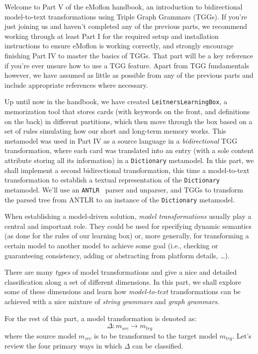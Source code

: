 \genHeader

Welcome to Part V of the eMoflon handbook, an introduction to bidirectional model-to-text transformations using Triple Graph Grammars (TGGs). If you're just
joining us and haven't completed any of the previous parts, we recommend working through at least Part I for the required setup and installation instructions
to ensure eMoflon is working correctly, and strongly encourage finishing Part IV to master the basics of TGGs. That part will be a key reference if you're ever
unsure how to use a TGG feature. Apart from TGG fundamentals however, we have assumed as little as possible from any of the previous parts and
include appropriate references where necessary.

Up until now in the handbook, we have created \texttt{LeitnersLearningBox}, a memorization tool that stores cards (with keywords on the front, and definitions
on the back) in different partitions, which then move through the box based on a set of rules simulating how our short and long-term memory works. This
metamodel was used in Part IV as a source language in a \emph{bidirectional}  TGG transformation, where each card was
translated into an entry (with a sole content attribute storing all its information) in a \texttt{Dictionary} metamodel. In this part, we shall implement a
second bidirectional transformation, this time a model-to-text transformation to establish a textual representation of the  \texttt{Dictionary} metamodel.
We'll use an \texttt{ANTLR}~\cite{ANTLR} parser and unparser, and TGGs to transform the parsed tree from ANTLR to an instance of the \texttt{Dictionary}
metamodel.

When establishing a model-driven solution, \emph{model transformations} usually play a central and important role. They could be used for specifying dynamic
semantics (as done for the rules of our learning box) or, more generally, for transforming a certain model to another model to achieve some goal (i.e.,
checking or guaranteeing consistency, adding or abstracting from platform details, \ldots).

There are many \emph{types} of model transformations and \cite{CH03,Mens_Gorp_2006} give a nice and detailed classification along a set of different dimensions.
In this part, we shall explore some of these dimensions and learn how \emph{model-to-text} transformations can be achieved with a nice mixture of \emph{string
grammars} and \emph{graph grammars}.

For the rest of this part, a model transformation is denoted as:
\begin{displaymath}
 	\Delta: m_{src} \rightarrow m_{trg}
\end{displaymath}
where the source model $m_{src}$ is to be transformed to the target model $m_{trg}$. Let's review the four primary ways in which $\Delta$ can be classified.

